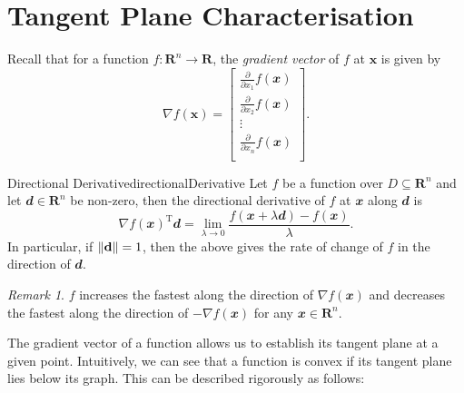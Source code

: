 \documentclass[math, code]{amznotes}
\theoremstyle{remark}
\newtheorem*{remark}{Remark}
\begin{document}
\section{Tangent Plane Characterisation}
Recall that for a function $f \colon \mathbf{R}^n \to \mathbf{R}$, the \textit{gradient vector} of $f$ at $\mathbf{x}$ is given by
\begin{equation*}
    \nabla f(\mathbf{x}) = \begin{bmatrix}
        \frac{\partial}{\partial x_1}f(\mathbfit{x}) \\
        \frac{\partial}{\partial x_2}f(\mathbfit{x}) \\
        \vdots \\
        \frac{\partial}{\partial x_n}f(\mathbfit{x}) \\
    \end{bmatrix}.
\end{equation*}
\begin{probox}{Directional Derivative}{directionalDerivative}
    Let $f$ be a function over $D \subseteq \mathbf{R}^n$ and let $\mathbfit{d} \in \mathbf{R}^n$ be non-zero, then the directional derivative of $f$ at $\mathbfit{x}$ along $\mathbfit{d}$ is
    \begin{equation*}
        \nabla f(\mathbfit{x})^{\mathrm{T}}\mathbfit{d} = \lim_{\lambda \to 0}\frac{f(\mathbfit{x} + \lambda\mathbfit{d}) - f(\mathbfit{x})}{\lambda}.
    \end{equation*}
    In particular, if ${\left\lVert {\mathbf{d}} \right\rVert} = 1$, then the above gives the rate of change of $f$ in the direction of $\mathbfit{d}$.
\end{probox}
\begin{notebox}
    \begin{remark}
        $f$ increases the fastest along the direction of $\nabla f(\mathbfit{x})$ and decreases the fastest along the direction of $-\nabla f(\mathbfit{x})$ for any $\mathbfit{x} \in \mathbf{R}^n$.
    \end{remark}
\end{notebox}
The gradient vector of a function allows us to establish its tangent plane at a given point. Intuitively, we can see that a function is convex if its tangent plane lies below its graph. This can be described rigorously as follows:
\end{document}
